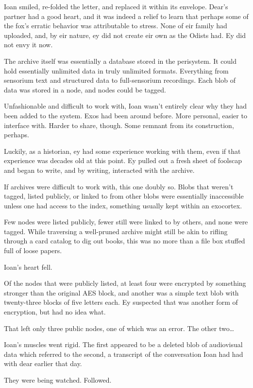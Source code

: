 Ioan smiled, re-folded the letter, and replaced it within its envelope. Dear's partner had a good heart, and it was indeed a relief to learn that perhaps some of the fox's erratic behavior was attributable to stress. None of eir family had uploaded, and, by eir nature, ey did not create eir own as the Odists had. Ey did not envy it now.

The archive itself was essentially a database stored in the perisystem. It could hold essentially unlimited data in truly unlimited formats. Everything from sensorium text and structured data to full-sensorium recordings. Each blob of data was stored in a node, and nodes could be tagged.

Unfashionable and difficult to work with, Ioan wasn't entirely clear why they had been added to the system. Exos had been around before. More personal, easier to interface with. Harder to share, though. Some remnant from its construction, perhaps.

Luckily, as a historian, ey had some experience working with them, even if that experience was decades old at this point. Ey pulled out a fresh sheet of foolscap and began to write, and by writing, interacted with the archive.

If archives were difficult to work with, this one doubly so. Blobs that weren't tagged, listed publicly, or linked to from other blobs were essentially inaccessible unless one had access to the index, something usually kept within an exocortex.

Few nodes were listed publicly, fewer still were linked to by others, and none were tagged. While traversing a well-pruned archive might still be akin to rifling through a card catalog to dig out books, this was no more than a file box stuffed full of loose papers.

Ioan's heart fell.

Of the nodes that were publicly listed, at least four were encrypted by something stronger than the original AES block, and another was a simple text blob with twenty-three blocks of five letters each. Ey suspected that was another form of encryption, but had no idea what.

That left only three public nodes, one of which was an error. The other two\ldots{}

Ioan's muscles went rigid. The first appeared to be a deleted blob of audiovisual data which referred to the second, a transcript of the conversation Ioan had had with dear earlier that day.

They were being watched. Followed.

